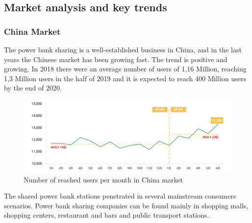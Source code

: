 \documentclass[12pt]{article}
\begin{document}
        \subsection{Market analysis and key trends}
            \subsubsection{China Market}
            The power bank sharing is a well-established business in China, 
            and in the last years the Chinese market has been growing fast. 
            The trend is positive and growing. In 2018 there were an average number of users of 1,16 Million, 
            reaching 1,3 Million users in the half of 2019 and it is expected to reach 400 Million users by the end of 2020. 
            \begin{figure}[h]
                \centering
                \includegraphics[width=1\textwidth]{china_graph}
                \caption{Number of reached users per month in China market}
            \end{figure}
            \newline
            The shared power bank stations penetrated in several mainstream consumers scenarios. 
            Power bank sharing companies can be found mainly in shopping malls, shopping centers, restaurant and bars and public transport stations. 
            
\end{document}
